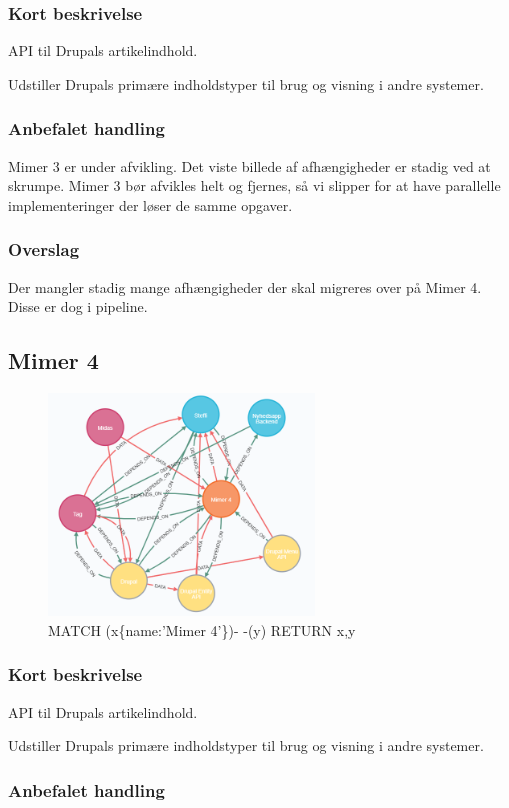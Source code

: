 \documentclass{article}
\begin{document}
\subsubsection*{Kort beskrivelse}
API til Drupals artikelindhold.

Udstiller Drupals primære indholdstyper til brug og visning i andre systemer.
\subsubsection*{Anbefalet handling}
Mimer 3 er under afvikling. Det viste billede af afhængigheder er stadig ved at skrumpe. Mimer 3 bør afvikles helt og fjernes, så vi slipper for at have parallelle implementeringer der løser de samme opgaver.
\subsubsection*{Overslag}
Der mangler stadig mange afhængigheder der skal migreres over på Mimer 4. Disse er dog i pipeline.


\subsection{Mimer 4}
\begin{figure}[h]
\includegraphics[width=200pt]{Mimer4.PNG}
\caption{MATCH (x\{name:'Mimer 4'\})- -(y) RETURN x,y}
\end{figure}
\subsubsection*{Kort beskrivelse}
API til Drupals artikelindhold.

Udstiller Drupals primære indholdstyper til brug og visning i andre systemer.
\subsubsection*{Anbefalet handling}
\end{document}
